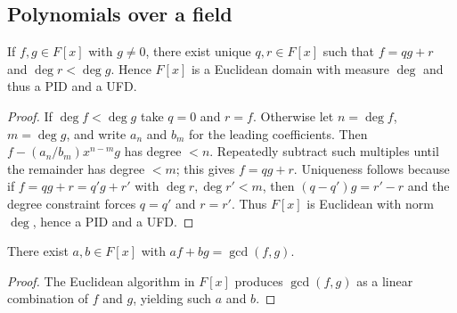 \subsection{Polynomials over a field}
\begin{proposition}\label{prop:division}
If $f,g\in F[x]$ with $g\neq0$, there exist unique $q,r\in F[x]$ such that $f=qg+r$ and $\deg r<\deg g$. Hence $F[x]$ is a Euclidean domain with measure $\deg$ and thus a PID and a UFD.
\end{proposition}
\begin{proof}
If $\deg f<\deg g$ take $q=0$ and $r=f$. Otherwise let $n=\deg f$, $m=\deg g$, and write $a_n$ and $b_m$ for the leading coefficients.
Then $f - (a_n/b_m)x^{n-m}g$ has degree $<n$.
Repeatedly subtract such multiples until the remainder has degree $<m$; this gives $f=qg+r$.
Uniqueness follows because if $f=qg+r=q'g+r'$ with $\deg r,\deg r'<m$, then $(q-q')g=r'-r$ and the degree constraint forces $q=q'$ and $r=r'$.
Thus $F[x]$ is Euclidean with norm $\deg$, hence a PID and a UFD.
\end{proof}
\begin{corollary}
There exist $a,b\in F[x]$ with $a f + b g = \gcd(f,g)$.
\end{corollary}
\begin{proof}
The Euclidean algorithm in $F[x]$ produces $\gcd(f,g)$ as a linear combination of $f$ and $g$, yielding such $a$ and $b$.
\end{proof}

